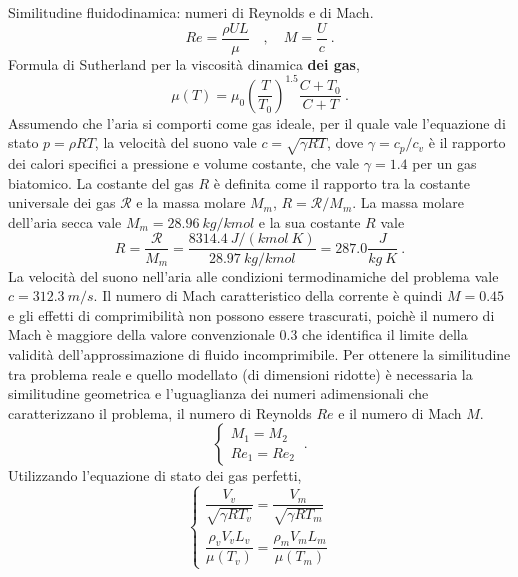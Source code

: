 \sol
%
\partone
Similitudine fluidodinamica: numeri di Reynolds e di Mach.
\begin{equation}
 Re = \frac{\rho U L}{\mu} \quad , \quad M = \frac{U}{c} \ .
\end{equation}
Formula di Sutherland per la viscosità dinamica \textbf{dei gas},
\begin{equation}
 \mu(T) = \mu_0 \displaystyle\left(\frac{T}{T_0}\right)^{1.5}
 \frac{C+T_0}{C+T} \ .
\end{equation}
%
\parttwo
Assumendo che l'aria si comporti come gas ideale, per il quale vale l'equazione di stato $p = \rho R T$, la velocità del suono vale $c = \sqrt{\gamma R T}$, dove $\gamma = c_p / c_v$ è il rapporto dei calori specifici a pressione e volume costante, che vale $\gamma = 1.4$ per un gas biatomico. La costante del gas $R$ è definita come il rapporto tra la costante universale dei gas $\mathscr{R}$ e la massa molare $M_m$, $R = \mathscr{R}/M_m$.
La massa molare dell'aria secca vale $M_m = 28.96 \ kg / kmol$ e la sua costante $R$ vale
\begin{equation}
 R = \dfrac{\mathscr{R}}{M_m} = \dfrac{8314.4 \ J / (kmol \ K)}{28.97 \ kg/kmol} = 287.0 \dfrac{J }{kg \ K} \ .
\end{equation}
La velocità del suono nell'aria alle condizioni termodinamiche del problema vale $c = 312.3 \ m/s$. Il numero di Mach caratteristico della corrente è quindi $M=0.45$ e gli effetti di comprimibilità non possono essere trascurati, poichè il numero di Mach è maggiore della valore convenzionale $0.3$ che identifica il limite della validità dell'approssimazione di fluido incomprimibile.
%
Per ottenere la similitudine tra problema reale e quello modellato (di dimensioni ridotte) è necessaria la similitudine geometrica e l'uguaglianza dei numeri adimensionali che caratterizzano il problema, il numero di Reynolds $Re$ e il numero di Mach $M$.
\begin{equation}
\begin{cases}
 M_1 = M_2 \\
 Re_1 = Re_2  
\end{cases} \ .
\end{equation}
Utilizzando l'equazione di stato dei gas perfetti,
\begin{equation}
\begin{cases}
 \dfrac{V_v}{\sqrt{\gamma R T_v}} = \dfrac{V_m}{\sqrt{\gamma R T_m}} \\
 \dfrac{\rho_v V_v L_v}{\mu(T_v)} = \dfrac{\rho_m V_m L_m}{\mu(T_m)}
\end{cases}
\end{equation}
